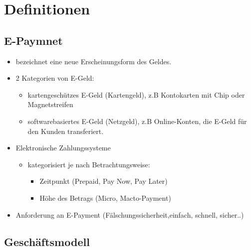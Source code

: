 \clearpage
\section{Definitionen}

\subsection{E-Paymnet}

\begin{itemize}

        \item bezeichnet eine neue Erscheinungsform des Geldes.
        \item 2 Kategorien von E-Geld:

    \begin{itemize}
        \item kartengeschützes E-Geld (Kartengeld), z.B Kontokarten mit Chip oder Magnetstreifen
        \item softwarebasiertes E-Geld (Netzgeld), z.B Online-Konten, die E-Geld für den Kunden transferiert.

    \end{itemize}

        \item Elektronische Zahlungssysteme
        \begin{itemize}
        \item kategorisiert je nach Betrachtungsweise:
        \begin{itemize}
                \item Zeitpunkt (Prepaid, Pay Now, Pay Later)
            \item Höhe des Betrags (Micro, Macto-Payment)
                \end{itemize}
        \end{itemize}



    \item Anforderung an E-Payment (Fälschungssicherheit,einfach, schnell, sicher..)
\end{itemize}




\subsection{Geschäftsmodell}

